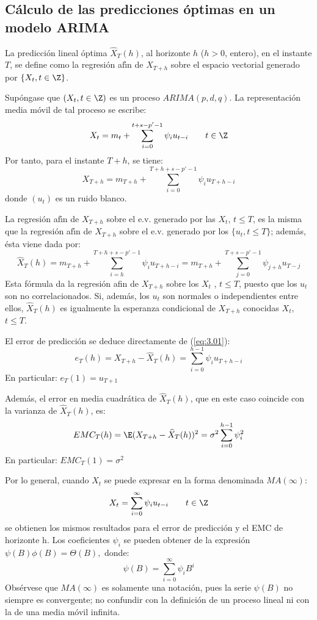\subsection{C\'{a}lculo de las predicciones \'{o}ptimas en un modelo 
ARIMA}

\begin{definicion}
La predicci\'{o}n lineal \'{o}ptima $\widehat{X}_{T} (h)$, al horizonte $h$ ($h>0$, entero), en el instante $T$, se define como la regresi\'{o}n af\'{\i}n de 
$X_{{T+h}}$ sobre el espacio vectorial generado por $\{X_t, t\in \Z\}$.
\end{definicion}

Sup\'{o}ngase que $(X_{t} , t \in \Z)$ es un proceso $ARIMA(p,d,q)$. La 
representaci\'{o}n media m\'{o}vil de tal proceso se escribe:
\[
X_{t} =m_{t} +\sum_{i=0}^{t+s-p'-1} {\psi_{i} u_{t-i} } \qquad  t\in \Z
\]
Por tanto, para el instante $T+h$, se tiene:
\[
X_{T+h} =m_{T+h} +\sum_{i=0}^{T+h+s-p'-1} {\psi_{i} u_{T+h-i} } 
\]
donde $(u_{t})$ es un ruido blanco.

La regresi\'{o}n af\'{\i}n de $X_{{T+h}}$ sobre el e.v. generado por 
las $X_{t}$, $t\le T$, es la misma que la regresi\'{o}n af\'{\i}n de $X_{{T+h}}$ sobre el e.v. generado por los $\{ u_{t} , t \le  T\}$; adem\'{a}s, \'{e}sta viene dada por:
\begin{equation}
\label{eq:3.01}
{\widehat{X}_{T} (h)=m_{T+h} 
+\sum_{i=h}^{T+h+s-p'-1} {\psi_{i} u_{T+h-i} } =m_{T+h} 
+\sum_{j=0}^{T+s-p'-1} {\psi_{j+h} u_{T-j} } }
\end{equation}
Esta f\'{o}rmula da la regresi\'{o}n afin de $X_{{T+h}}$ sobre los $X_{t}$ , $t\le T$, puesto que los $u_{t}$ son no correlacionados. Si, adem\'{a}s, los $u_{t}$ son normales o independientes entre ellos, $\widehat{X}_{T} (h)$ es igualmente la esperanza condicional de $X_{{T+h}}$ conocidas $X_{t}$, $t \le T$.

El error de predicci\'{o}n se deduce directamente de (\ref{eq:3.01}):
\[
e_{T} (h)=X_{T+h} -\widehat{X} _{T} 
(h)=\sum_{i=0}^{h-1} {\psi_{i} u_{T+h-i} } 
\]
En particular: $e_{T} (1)=u_{T+1} $

Adem\'{a}s, el error en media cuadr\'{a}tica de $\widehat{X}_{T} (h)$, que en este caso coincide con la varianza 
de $\widehat{X}_{T} (h)$, es: 
\[
EMC_{T} (h)=\E(X_{T+h} -\widehat{X} _{T} (h))^{2}=\sigma ^{2}\sum_{i=0}^{h-1} {\psi_{i}^{2} } 
\]
En particular: $EMC_{T} (1)=\sigma^{2}$

\begin{observacion}
Por lo general, cuando $X_{t} $ se puede expresar en la forma denominada $MA(\infty )$:
\[
X_{t} =\sum_{i=0}^\infty {\psi_{i} u_{t-i} } 
\qquad
t\in \Z
\]
se obtienen los mismos resultados para el error de predicci\'{o}n y el EMC 
de horizonte h. Los coeficientes $\psi_{i} $ se pueden obtener de la 
expresi\'{o}n $\psi (B)\phi (B)=\Theta (B),$ donde:
\[
\psi (B)=\sum_{i=0}^{\infty } \psi_{i} B^{i}
\]
Obs\'{e}rvese que $MA(\infty )$ es solamente una notaci\'{o}n, pues la serie 
$\psi (B)$ no siempre es convergente; no confundir con la definici\'{o}n de 
un proceso lineal ni con la de una media m\'{o}vil infinita.
\end{observacion}


